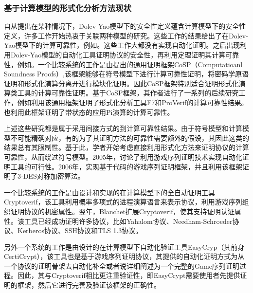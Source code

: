 \subsubsection{基于计算模型的形式化分析方法现状}

自从\citet{abadi2000reconciling}提出在某种情况下，Dolev-Yao模型下的安全性定义蕴含计算模型下的安全性定义，许多工作开始热衷于关联两种模型的研究。这些工作的结果给出了在Dolev-Yao模型下的计算可靠性，例如\citep{backes2003composable,cortier2005computationally,janvier2005completing}。这些工作大都没有实现自动化证明。之后出现利用Dolev-Yao模型的自动化工具证明协议的安全性，再利用定理证明其计算可靠性，例如\citep{canetti2006universally}。一个比较系统的工作是由\citet{backes2009cosp}提出的通用证明框架CoSP（Computatioanl Soundness Proofs）,该框架能够在符号模型下进行计算可靠性证明，将密码学原语证明和形式化演算分离开进行模块化证明。因此CoSP框架特别适合证明形式化演算类工具的计算可靠性证明。基于CoSP框架，其作者进行了一系列的后续研究工作，例如利用该通用框架证明了形式化分析工具F7\citep{backes2010computationally}和ProVerif\citep{backes2014computational}的计算可靠性结果。\citet{shao2016computational}也利用此框架证明了带状态的应用Pi演算的计算可靠性。

上述这些研究都是属于采用间接方式的到计算可靠性结果。由于符号模型和计算模型不可能精确对应，有的为了其证明方法的可靠性需要额外的假设，其因此这类的结果总有其限制性。基于此，学者开始考虑直接利用形式化方法来证明协议的计算可靠性，从而绕过符号模型。2005年，\citet{halevi2005plausible}讨论了利用游戏序列证明技术实现自动化证明工具的可行性。2006年，\citet{bellare2006security}实现基于代码的游戏序列证明框架，并且利用该框架证明了3-DES对称加密算法。

一个比较系统的工作是由\citet{blanchet2006computationally,blanchet2008computationally}设计和实现的在计算模型下的全自动证明工具Cryptoverif，该工具利用概率多项式的进程演算语言来表示协议，利用游戏序列组织证明协议的机密属性。翌年，Blanchet扩展Cryptoverif\citep{blanchet2007computationally}，使其支持证明认证属性。该工具已经成功证明许多协议，比如Yahalom协议、Needham-Schroeder协议、Kerberos协议\citep{BlanchetJaggardScedrovTsayAsiaCCS08}、SSH协议\citep{cade2013computationally}和TLS 1.3协议\citep{BlanchetCSF18}。

另外一个系统的工作是由\citet{barthe2011computer}设计的在计算模型下自动化验证工具EasyCryp（其前身CertiCrypt\citep{barthe2009formal}），该工具也是基于游戏序列证明协议，其提供的自动化证明方式为从一个协议的证明骨架去自动化补全或者说详细阐述为一个完整的Game序列证明过程。因此，其与Cryptoverif相比更注重验证性，即EasyCrypt需要使用者先提供证明的框架，然后它进行完善及验证该框架的正确性。

